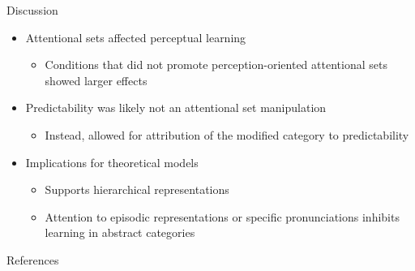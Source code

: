 \documentclass{beamer}
\begin{document}
\begin{frame}{Discussion}

\begin{itemize}
\item Attentional sets affected perceptual learning
\begin{itemize}
\item Conditions that did not promote perception-oriented attentional sets showed larger effects
\end{itemize}
\item Predictability was likely not an attentional set manipulation
\begin{itemize}
\item Instead, allowed for attribution of the modified category to predictability
\end{itemize}
\item Implications for theoretical models
\begin{itemize}
\item Supports hierarchical representations
\item Attention to episodic representations or specific pronunciations inhibits learning in abstract categories
\end{itemize}
\end{itemize}


\end{frame}

\begin{frame}[allowframebreaks]{References}%
    \footnotesize


    
\end{frame}
\end{document}
